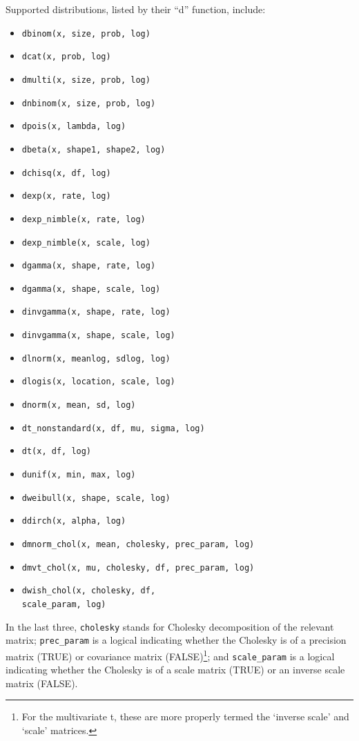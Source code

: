 \documentclass[12pt,oneside]{book}\usepackage[]{graphicx}\usepackage[]{color}
\def\cd#1{\texttt{#1}}
\begin{document}
Supported distributions, listed by their ``d'' function, include:
\begin{multicols}{2}
\begin{itemize}
\item \cd{dbinom(x, size, prob, log)}
\item \cd{dcat(x, prob, log)}
\item \cd{dmulti(x, size, prob, log)}
\item \cd{dnbinom(x, size, prob, log)}
\item \cd{dpois(x, lambda, log)}
\item \cd{dbeta(x, shape1, shape2, log)}
\item \cd{dchisq(x, df, log)}
\item \cd{dexp(x, rate, log)}
\item \cd{dexp\_nimble(x, rate, log)}
\item \cd{dexp\_nimble(x, scale, log)}
\item \cd{dgamma(x, shape, rate, log)}
\item \cd{dgamma(x, shape, scale, log)}
\item \cd{dinvgamma(x, shape, rate, log)}
\item \cd{dinvgamma(x, shape, scale, log)}
\item \cd{dlnorm(x, meanlog, sdlog, log)}
\item \cd{dlogis(x, location, scale, log)}
\item \cd{dnorm(x, mean, sd, log)}
 \item \cd{dt\_nonstandard(x, df, mu, sigma, log)}
 \item \cd{dt(x, df, log)}
 \item \cd{dunif(x, min, max, log)}
 \item \cd{dweibull(x, shape, scale, log)}
  \item \cd{ddirch(x, alpha, log)}
  \item \cd{dmnorm\_chol(x, mean, cholesky, prec\_param, log)}
  \item \cd{dmvt\_chol(x, mu, cholesky, df, prec\_param, log)}
  \item \cd{dwish\_chol(x, cholesky, df, \\scale\_param, log)}
\end{itemize}
\end{multicols}

In the last three, \cd{cholesky} stands for Cholesky decomposition of the relevant matrix; 
\cd{prec\_param} is a logical indicating whether the Cholesky is of a
precision matrix (TRUE) or covariance matrix (FALSE)\footnote{For the multivariate t, these are more properly termed the `inverse scale' and `scale' matrices.}; and \cd{scale\_param} is a logical indicating whether the Cholesky is of a scale matrix (TRUE) or an inverse scale matrix (FALSE).
\end{document}

